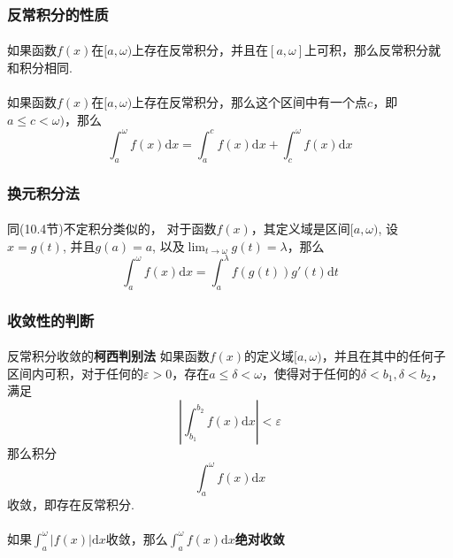 \subsubsection{反常积分的性质}
\paragraph{}
如果函数$f(x)$在$[a, \omega)$上存在反常积分，并且在$[a, \omega]$上可积，那么反常积分就和积分相同.

\paragraph{}
如果函数$f(x)$在$[a, \omega)$上存在反常积分，那么这个区间中有一个点$c$，即$a \leq c < \omega)$，那么
$$
\int_a^\omega f(x) \mathrm{d} x = \int_a^c f(x) \mathrm{d} x + \int_c^\omega f(x) \mathrm{d} x
$$

\subsubsection{换元积分法}
\paragraph{}
同(10.4节)不定积分类似的， 对于函数$f(x)$，其定义域是区间$[a, \omega )$, 设$x = g(t)$, 并且$g(a) = a$, 以及$\lim_{t\to \omega} g(t) = \lambda$，那么
$$
\int_a^\omega f(x) \mathrm{d} x = \int_a^\lambda f(g(t)) g'(t) \mathrm{d} t
$$

\subsubsection{收敛性的判断}
\paragraph{}
反常积分收敛的\textbf{柯西判别法}\: 如果函数$f(x)$的定义域$[a, \omega)$，并且在其中的任何子区间内可积，对于任何的$\varepsilon > 0$，存在$a \leq \delta < \omega$，使得对于任何的$\delta < b_1, \delta < b_2$，满足
$$
|\int_{b_1}^{b_2} f(x) \mathrm{d} x | < \varepsilon
$$
那么积分
$$
\int_a^\omega f(x) \mathrm{d} x 
$$
收敛，即存在反常积分.


\paragraph{}
如果$\int_a^\omega |f(x)| \mathrm{d} x$收敛，那么$\int_a^\omega f(x) \mathrm{d} x$\textbf{绝对收敛}


